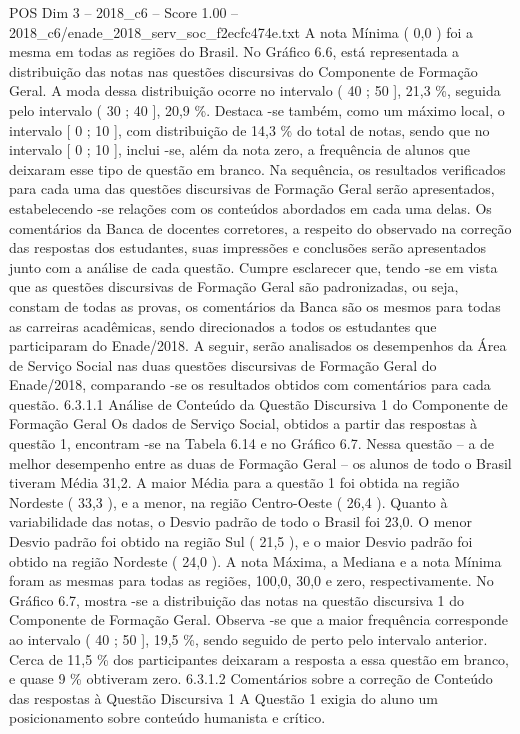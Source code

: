 \begin{textsample}{POS Dim 3 – 2018\_c6 – Score 1.00 – 2018\_c6/enade\_2018\_serv\_soc\_f2ecfc474e.txt}
A nota Mínima ( 0,0 ) foi a mesma em todas as regiões do Brasil.
No Gráfico 6.6, está representada a distribuição das notas nas questões discursivas do Componente de Formação Geral.
A moda dessa distribuição ocorre no intervalo ( 40 ; 50 ], 21,3 \%, seguida pelo intervalo ( 30 ; 40 ], 20,9 \%.
Destaca -se também, como um máximo local, o intervalo [ 0 ; 10 ], com distribuição de 14,3 \% do total de notas, sendo que no intervalo [ 0 ; 10 ], inclui -se, além da nota zero, a frequência de alunos que deixaram esse tipo de questão em branco.
Na sequência, os resultados verificados para cada uma das questões discursivas de Formação Geral serão apresentados, estabelecendo -se relações com os conteúdos abordados em cada uma delas.
Os comentários da Banca de docentes corretores, a respeito do observado na correção das respostas dos estudantes, suas impressões e conclusões serão apresentados junto com a análise de cada questão.
Cumpre esclarecer que, tendo -se em vista que as questões discursivas de Formação Geral são padronizadas, ou seja, constam de todas as provas, os comentários da Banca são os mesmos para todas as carreiras acadêmicas, sendo direcionados a todos os estudantes que participaram do Enade/2018.
A seguir, serão analisados os desempenhos da Área de Serviço Social nas duas questões discursivas de Formação Geral do Enade/2018, comparando -se os resultados obtidos com comentários para cada questão. 6.3.1.1 Análise de Conteúdo da Questão Discursiva 1 do Componente de Formação Geral Os dados de Serviço Social, obtidos a partir das respostas à questão 1, encontram -se na Tabela 6.14 e no Gráfico 6.7.
Nessa questão – a de melhor desempenho entre as duas de Formação Geral – os alunos de todo o Brasil tiveram Média 31,2.
A maior Média para a questão 1 foi obtida na região Nordeste ( 33,3 ), e a menor, na região Centro-Oeste ( 26,4 ).
Quanto à variabilidade das notas, o Desvio padrão de todo o Brasil foi 23,0.
O menor Desvio padrão foi obtido na região Sul ( 21,5 ), e o maior Desvio padrão foi obtido na região Nordeste ( 24,0 ).
A nota Máxima, a Mediana e a nota Mínima foram as mesmas para todas as regiões, 100,0, 30,0 e zero, respectivamente.
No Gráfico 6.7, mostra -se a distribuição das notas na questão discursiva 1 do Componente de Formação Geral.
Observa -se que a maior frequência corresponde ao intervalo ( 40 ; 50 ], 19,5 \%, sendo seguido de perto pelo intervalo anterior.
Cerca de 11,5 \% dos participantes deixaram a resposta a essa questão em branco, e quase 9 \% obtiveram zero. 6.3.1.2 Comentários sobre a correção de Conteúdo das respostas à Questão Discursiva 1 A Questão 1 exigia do aluno um posicionamento sobre conteúdo humanista e crítico.

\end{textsample}
